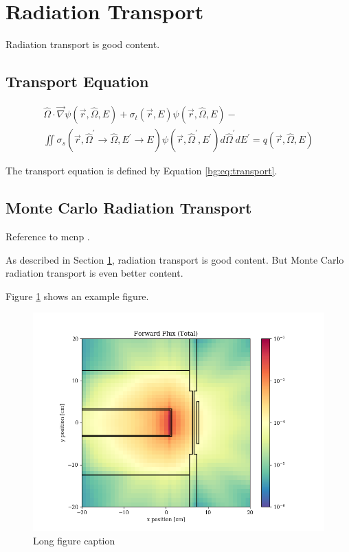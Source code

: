 \section{Radiation Transport}
\label{sec:bg:rt}

Radiation transport is good content.

\subsection{Transport Equation}

\begin{multline}\label{bg:eq:transport}
  \hat{\Omega}\cdot\vec{\nabla}\psi\left(\vec{r},\hat{\Omega},E\right) +
  \sigma_t\left(\vec{r},E\right)\psi\left(\vec{r},\hat{\Omega},E\right) - \\
  \iint\sigma_s\left(\vec{r},\hat{\Omega}^\prime\rightarrow\hat{\Omega},E^\prime\rightarrow E\right)\psi\left(\vec{r},\hat{\Omega}^\prime,E^\prime\right)d\hat{\Omega}^\prime dE^\prime =
  q\left(\vec{r},\hat{\Omega},E\right)
\end{multline}

The transport equation is defined by Equation \ref{bg:eq:transport}.

\subsection{Monte Carlo Radiation Transport}
\label{sec:bg:mc}

Reference to \ac{mcnp} \cite{mcnp5-theory}.

As described in Section \ref{sec:bg:rt}, radiation transport is good content.
But Monte Carlo radiation transport is even better content.

Figure \ref{fig:bg:flux} shows an example figure.

\begin{figure}[h!]
  \centering
  \includegraphics[width=1.0\textwidth]{content/scalar_flux_fwd_total.png}
  \caption[Short figure caption]{Long figure caption}
  \label{fig:bg:flux}
\end{figure}

